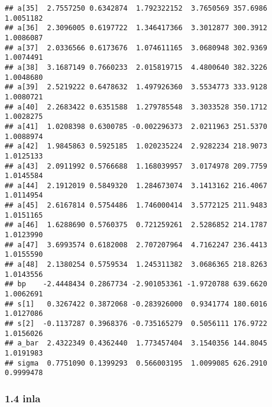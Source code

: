 \documentclass[
]{article}
\begin{document}
\begin{verbatim}
## a[35]  2.7557250 0.6342874  1.792322152  3.7650569 357.6986 1.0051182
## a[36]  2.3096005 0.6197722  1.346417366  3.3012877 300.3912 1.0086087
## a[37]  2.0336566 0.6173676  1.074611165  3.0680948 302.9369 1.0074491
## a[38]  3.1687149 0.7660233  2.015819715  4.4800640 382.3226 1.0048680
## a[39]  2.5219222 0.6478632  1.497926360  3.5534773 333.9128 1.0080721
## a[40]  2.2683422 0.6351588  1.279785548  3.3033528 350.1712 1.0028275
## a[41]  1.0208398 0.6300785 -0.002296373  2.0211963 251.5370 1.0088974
## a[42]  1.9845863 0.5925185  1.020235224  2.9282234 218.9073 1.0125133
## a[43]  2.0911992 0.5766688  1.168039957  3.0174978 209.7759 1.0145584
## a[44]  2.1912019 0.5849320  1.284673074  3.1413162 216.4067 1.0114954
## a[45]  2.6167814 0.5754486  1.746000414  3.5772125 211.9483 1.0151165
## a[46]  1.6288690 0.5760375  0.721259261  2.5286852 214.1787 1.0123990
## a[47]  3.6993574 0.6182008  2.707207964  4.7162247 236.4413 1.0155590
## a[48]  2.1380254 0.5759534  1.245311382  3.0686365 218.8263 1.0143556
## bp    -2.4448434 0.2867734 -2.901053361 -1.9720788 639.6620 1.0062691
## s[1]   0.3267422 0.3872068 -0.283926000  0.9341774 180.6016 1.0127086
## s[2]  -0.1137287 0.3968376 -0.735165279  0.5056111 176.9722 1.0156026
## a_bar  2.4322349 0.4362440  1.773457404  3.1540356 144.8045 1.0191983
## sigma  0.7751090 0.1399293  0.566003195  1.0099085 626.2910 0.9999478
\end{verbatim}

\hypertarget{inla-3}{%
\subsubsection{1.4 inla}\label{inla-3}}
\end{document}
